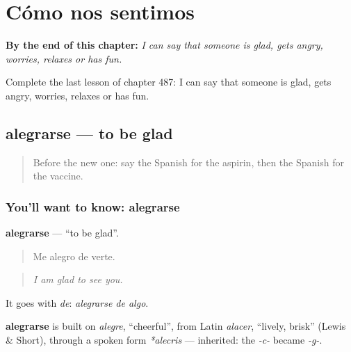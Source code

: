 
\chapter{Cómo nos sentimos}
\label{ch:es-como-nos-sentimos}

\begin{chapteropening}
\textbf{By the end of this chapter:} \emph{I can say that someone is glad, gets angry, worries, relaxes or has fun.}

Complete the last lesson of chapter 487: I can say that someone is glad, gets angry, worries, relaxes or has fun.
\end{chapteropening}

\section[alegrarse]{alegrarse — to be glad}

\label{lesson:ES-C487-alegrarse}



\begin{quote}
Before the new one: say the Spanish for the aspirin, then the Spanish for the vaccine.
\end{quote}

\subsection*{You'll want to know: alegrarse}
\textbf{alegrarse} — \textquotedblleft{}to be glad\textquotedblright{}.

\begin{quote}
Me alegro de verte.
\end{quote}

\begin{quote}
\emph{I am glad to see you.}
\end{quote}

It goes with \emph{de}: \emph{alegrarse de algo}.

\begin{cousinweb}
\textbf{alegrarse} is built on \emph{alegre}, \textquotedblleft{}cheerful\textquotedblright{}, from Latin \emph{alacer}, \textquotedblleft{}lively, brisk\textquotedblright{} (Lewis \& Short), through a spoken form \emph{*alecris} — inherited: the \emph{-c-} became \emph{-g-}.
\end{cousinweb}

